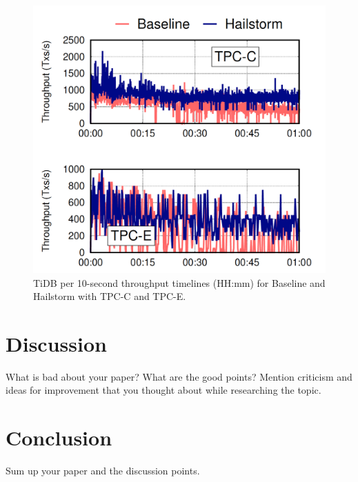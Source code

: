 \documentclass[a4paper,10pt,twoside]{article}
\begin{document}
\begin{figure}[h]
    \centering
	\includegraphics[scale=0.3]{TiDB_result.png}
    \caption{TiDB per 10-second throughput timelines (HH:mm)
	for Baseline and Hailstorm with TPC-C and TPC-E.}
    \label{fig:mesh1}
\end{figure}


\section{Discussion}

What is bad about your paper? 
What are the good points? 
Mention criticism and ideas for improvement that you thought about while researching the topic.

\section{Conclusion}

Sum up your paper and the discussion points.


 
\end{document}

